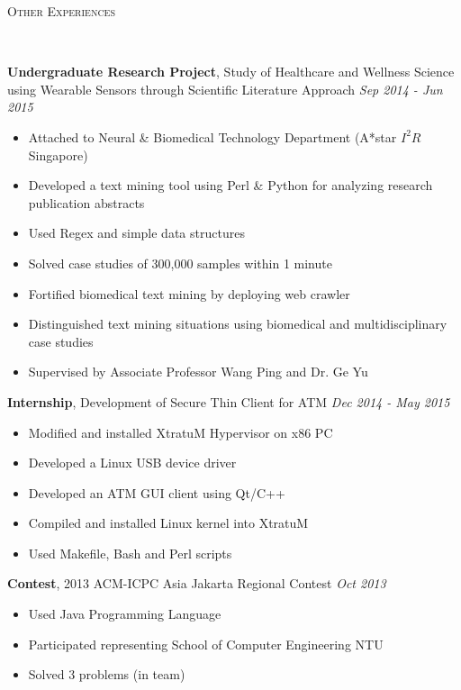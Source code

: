 \documentclass[a4paper, 12pt]{article}
\newenvironment{changemargin}[2]{%
  \begin{list}{}{%
      \setlength{\topsep}{0pt}%
      \setlength{\leftmargin}{#1}%
      \setlength{\rightmargin}{#2}%
      \setlength{\listparindent}{\parindent}%
      \setlength{\itemindent}{\parindent}%
      \setlength{\parsep}{\parskip}%
    }%
  \item[]}{\end{list}
}
\newcommand{\lineover}{
  \begin{changemargin}{-0.05in}{-0.05in}
    \vspace*{-8pt}
    \hrulefill \\
    \vspace*{-2pt}
  \end{changemargin}
}
\newcommand{\header}[1]{
  \begin{changemargin}{-0.5in}{-0.5in}
    \scshape{#1}\\
    \lineover
  \end{changemargin}
}
\newenvironment{body}
{
\vspace*{-16pt}
\begin{changemargin}{-0.25in}{-0.5in}
}	
{
\end{changemargin}
}
\begin{document}
\header{Other Experiences}

\begin{body}
  \vspace{14pt}

  \textbf{Undergraduate Research Project}, {Study of Healthcare and Wellness Science using Wearable Sensors through Scientific Literature Approach} \hfill \emph{Sep 2014 - Jun 2015}\\
  \vspace*{-4pt}
  \begin{itemize} \itemsep -0pt  \small
  \item Attached to Neural \& Biomedical Technology Department (A*star $I^{2}R$ Singapore)
  \item Developed a text mining tool using Perl \& Python for analyzing research publication abstracts
  \item Used Regex and simple data structures
  \item Solved case studies of 300,000 samples within 1 minute
  \item Fortified biomedical text mining by deploying web crawler
  \item Distinguished text mining situations using biomedical and multidisciplinary case studies
  \item Supervised by Associate Professor Wang Ping and Dr. Ge Yu
  \end{itemize}

  \textbf{Internship}, {Development of Secure Thin Client for ATM} \hfill \emph{Dec 2014 - May 2015}\\
  \vspace*{-4pt}
  \begin{itemize} \itemsep -0pt  \small
  \item Modified and installed XtratuM Hypervisor on x86 PC
  \item Developed a Linux USB device driver
  \item Developed an ATM GUI client using Qt/C++
  \item Compiled and installed Linux kernel into XtratuM
  \item Used Makefile, Bash and Perl scripts
  \end{itemize}

  \textbf{Contest}, {2013 ACM-ICPC Asia Jakarta Regional Contest} \hfill \emph{Oct 2013}\\
  \vspace*{-4pt}
  \begin{itemize} \itemsep -0pt  \small
  \item Used Java Programming Language
  \item Participated representing School of Computer Engineering NTU
  \item Solved 3 problems (in team)
  \end{itemize}
  

\end{body}
\end{document}
